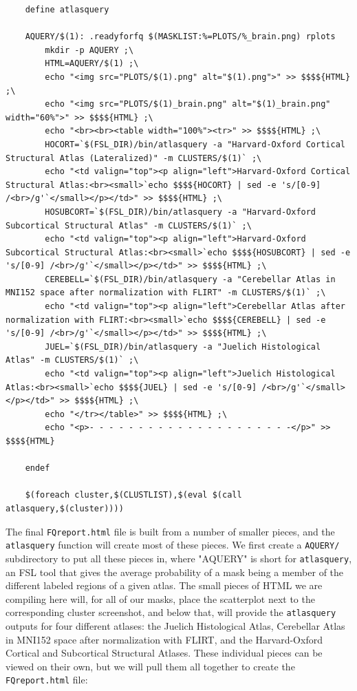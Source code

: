\begin{lstlisting}
	define atlasquery
	
	AQUERY/$(1): .readyforfq $(MASKLIST:%=PLOTS/%_brain.png) rplots
		mkdir -p AQUERY ;\
		HTML=AQUERY/$(1) ;\
		echo "<img src="PLOTS/$(1).png" alt="$(1).png">" >> $$$${HTML} ;\
		echo "<img src="PLOTS/$(1)_brain.png" alt="$(1)_brain.png" width="60%">" >> $$$${HTML} ;\
		echo "<br><br><table width="100%"><tr>" >> $$$${HTML} ;\
		HOCORT=`$(FSL_DIR)/bin/atlasquery -a "Harvard-Oxford Cortical Structural Atlas (Lateralized)" -m CLUSTERS/$(1)` ;\
		echo "<td valign="top"><p align="left">Harvard-Oxford Cortical Structural Atlas:<br><small>`echo $$$${HOCORT} | sed -e 's/[0-9] /<br>/g'`</small></p></td>" >> $$$${HTML} ;\
		HOSUBCORT=`$(FSL_DIR)/bin/atlasquery -a "Harvard-Oxford Subcortical Structural Atlas" -m CLUSTERS/$(1)` ;\
		echo "<td valign="top"><p align="left">Harvard-Oxford Subcortical Structural Atlas:<br><small>`echo $$$${HOSUBCORT} | sed -e 's/[0-9] /<br>/g'`</small></p></td>" >> $$$${HTML} ;\
		CEREBELL=`$(FSL_DIR)/bin/atlasquery -a "Cerebellar Atlas in MNI152 space after normalization with FLIRT" -m CLUSTERS/$(1)` ;\
		echo "<td valign="top"><p align="left">Cerebellar Atlas after normalization with FLIRT:<br><small>`echo $$$${CEREBELL} | sed -e 's/[0-9] /<br>/g'`</small></p></td>" >> $$$${HTML} ;\
		JUEL=`$(FSL_DIR)/bin/atlasquery -a "Juelich Histological Atlas" -m CLUSTERS/$(1)` ;\
		echo "<td valign="top"><p align="left">Juelich Histological Atlas:<br><small>`echo $$$${JUEL} | sed -e 's/[0-9] /<br>/g'`</small></p></td>" >> $$$${HTML} ;\
		echo "</tr></table>" >> $$$${HTML} ;\
		echo "<p>- - - - - - - - - - - - - - - - - - - - -</p>" >> $$$${HTML}
				
	endef
	
	$(foreach cluster,$(CLUSTLIST),$(eval $(call atlasquery,$(cluster))))
\end{lstlisting}

The final \texttt{FQreport.html} file is built from a number of smaller pieces, and the \texttt{atlasquery} function will create most of these pieces. We first create a \texttt{AQUERY/} subdirectory to put all these pieces in, where "AQUERY" is short for \texttt{atlasquery}, an FSL tool that gives the average probability of a mask being a member of the different labeled regions of a given atlas. The small pieces of HTML we are compiling here will, for all of our masks, place the scatterplot next to the corresponding cluster screenshot, and below that, will provide the \texttt{atlasquery} outputs for four different atlases: the Juelich Histological Atlas, Cerebellar Atlas in MNI152 space after normalization with FLIRT, and the Harvard-Oxford Cortical and Subcortical Structural Atlases. These individual pieces can be viewed on their own, but we will pull them all together to create the \texttt{FQreport.html} file:

